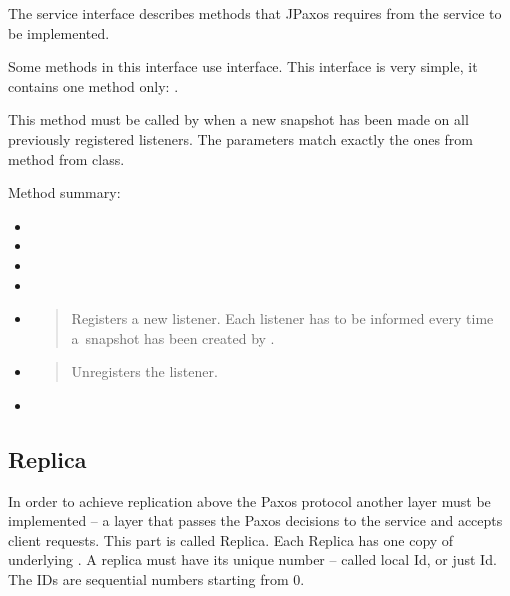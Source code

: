 \label{api:service-interface}\label{api:jpaxos-service}
The service interface describes methods that JPaxos requires from the service to be implemented.

Some methods in this interface use  interface. This interface is very simple, it contains one method only: .

This method must be called by  when a new snapshot has been made on all previously registered listeners. The parameters match exactly the ones from  method from  class.

Method summary:
\begin{itemize}
\item {} 

\item {} 

\item {} 

\item {} 

\item {} 
\begin{quote}

Registers a new listener. Each listener has to be informed every time a~snapshot has been created by .
\end{quote}

\item {} 
\begin{quote}

Unregisters the listener.
\end{quote}

\item {} 

\end{itemize}


\subsection{Replica}
\label{api:jpaxos-replica}\label{api:replica}
In order to achieve replication above the Paxos protocol another layer must be implemented -- a layer that passes the Paxos decisions to the service and accepts client requests. This part is called Replica. Each Replica has one copy of underlying . A replica must have its unique number -- called local Id, or just Id. The IDs are sequential numbers starting from 0.

